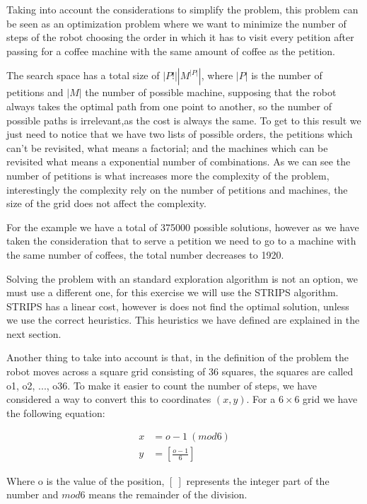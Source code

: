 \documentclass[12pt,a4paper,oneside]{article}
\numberwithin{equation}{section}
\numberwithin{equation}{section}
\theoremstyle{definition}
\begin{document}
Taking into account the considerations to simplify the problem, this problem can be seen as an optimization problem where we want to minimize the number of steps of the robot choosing the order in which it has to visit every petition after passing for a coffee machine with the same amount of coffee as the petition. 

The search space has a total size of $|P!||M^{|P|}|$, where $|P|$ is the number of petitions and $|M|$ the number of possible machine, supposing that the robot always takes the optimal path from one point to another, so the number of possible paths is irrelevant,as the cost is always the same. To get to this result we just need to notice that we have two lists of possible orders, the petitions which can't be revisited, what means a factorial; and the machines which can be revisited what means a exponential number of combinations. As we can see the number of petitions is what increases more the complexity of the problem, interestingly the complexity rely on the number of petitions and machines, the size of the grid does not affect the complexity.

For the example we have a total of 375000 possible solutions, however as we have taken the consideration that to serve a petition we need to go to a machine with the same number of coffees, the total number decreases to 1920.

Solving the problem with an standard exploration algorithm is not an option, we must use a different one, for this exercise we will use the STRIPS algorithm. STRIPS has a linear cost, however is does not find the optimal solution, unless we use the correct heuristics. This heuristics we have defined are explained in the next section.

Another thing to take into account is that, in the definition of the problem the robot moves across a square grid consisting of 36 squares, the squares are called o1, o2, ..., o36. To make it easier to count the number of steps, we have considered a way to convert this to coordinates $(x,y)$. For a $6 \times 6$ grid we have the following equation:

\begin{align}
	x & = o-1 \ (mod6) \\
	y & = [\frac{o-1}{6}] 
\end{align}

Where o is the value of the position, $[ \ ]$ represents the integer part of the number and  $mod6$ means the remainder of the division.
\end{document}
